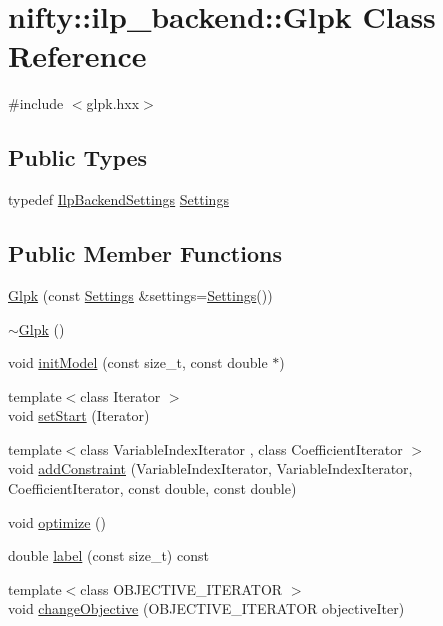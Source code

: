 \hypertarget{classnifty_1_1ilp__backend_1_1Glpk}{}\section{nifty\+:\+:ilp\+\_\+backend\+:\+:Glpk Class Reference}
\label{classnifty_1_1ilp__backend_1_1Glpk}


{\ttfamily \#include $<$glpk.\+hxx$>$}

\subsection*{Public Types}
\begin{DoxyCompactItemize}
\item 
typedef \hyperlink{structnifty_1_1ilp__backend_1_1IlpBackendSettings}{Ilp\+Backend\+Settings} \hyperlink{classnifty_1_1ilp__backend_1_1Glpk_ad3b3bbef1c726fb6a6f11a06282fd7dc}{Settings}
\end{DoxyCompactItemize}
\subsection*{Public Member Functions}
\begin{DoxyCompactItemize}
\item 
\hyperlink{classnifty_1_1ilp__backend_1_1Glpk_a309d8e70cff5c6c330b78e27ab1f0dfa}{Glpk} (const \hyperlink{classnifty_1_1ilp__backend_1_1Glpk_ad3b3bbef1c726fb6a6f11a06282fd7dc}{Settings} \&settings=\hyperlink{classnifty_1_1ilp__backend_1_1Glpk_ad3b3bbef1c726fb6a6f11a06282fd7dc}{Settings}())
\item 
\hyperlink{classnifty_1_1ilp__backend_1_1Glpk_a9696f83fd9a1688bcdf5a05b84c03976}{$\sim$\+Glpk} ()
\item 
void \hyperlink{classnifty_1_1ilp__backend_1_1Glpk_a82a16f1598798e5935d4b56a692d3b5a}{init\+Model} (const size\+\_\+t, const double $\ast$)
\item 
{\footnotesize template$<$class Iterator $>$ }\\void \hyperlink{classnifty_1_1ilp__backend_1_1Glpk_a7d71ee633ecc892e6d2e904a30604394}{set\+Start} (Iterator)
\item 
{\footnotesize template$<$class Variable\+Index\+Iterator , class Coefficient\+Iterator $>$ }\\void \hyperlink{classnifty_1_1ilp__backend_1_1Glpk_a756aac8075dfd7957e0b90e27f1b141d}{add\+Constraint} (Variable\+Index\+Iterator, Variable\+Index\+Iterator, Coefficient\+Iterator, const double, const double)
\item 
void \hyperlink{classnifty_1_1ilp__backend_1_1Glpk_a2e66c98281cb549ee477d58fbd3b8374}{optimize} ()
\item 
double \hyperlink{classnifty_1_1ilp__backend_1_1Glpk_a37396f440ddcda1e15b6486ed48642e1}{label} (const size\+\_\+t) const 
\item 
{\footnotesize template$<$class O\+B\+J\+E\+C\+T\+I\+V\+E\+\_\+\+I\+T\+E\+R\+A\+T\+O\+R $>$ }\\void \hyperlink{classnifty_1_1ilp__backend_1_1Glpk_a31c379a5553eb4fd87a56e71ac589a80}{change\+Objective} (O\+B\+J\+E\+C\+T\+I\+V\+E\+\_\+\+I\+T\+E\+R\+A\+T\+O\+R objective\+Iter)
\end{DoxyCompactItemize}
